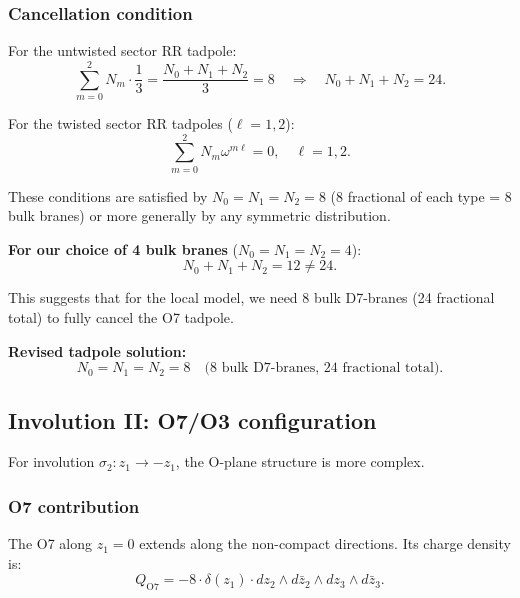 \documentclass[11pt]{article}
\begin{document}
\subsubsection{Cancellation condition}

For the untwisted sector RR tadpole:
\begin{equation}
\sum_{m=0}^{2} N_m \cdot \frac{1}{3} = \frac{N_0 + N_1 + N_2}{3} = 8 \quad \Rightarrow \quad N_0 + N_1 + N_2 = 24.
\end{equation}

For the twisted sector RR tadpoles ($\ell = 1, 2$):
\begin{equation}
\sum_{m=0}^{2} N_m \omega^{m\ell} = 0, \quad \ell = 1, 2.
\end{equation}

These conditions are satisfied by $N_0 = N_1 = N_2 = 8$ (8 fractional of each type = 8 bulk branes) or more generally by any symmetric distribution.

\textbf{For our choice of 4 bulk branes} ($N_0 = N_1 = N_2 = 4$):
\begin{equation}
N_0 + N_1 + N_2 = 12 \neq 24.
\end{equation}

This suggests that for the local model, we need 8 bulk D7-branes (24 fractional total) to fully cancel the O7 tadpole.

\textbf{Revised tadpole solution:}
\begin{equation}\boxed{
N_0 = N_1 = N_2 = 8 \quad \text{(8 bulk D7-branes, 24 fractional total)}.
}
\end{equation}

\subsection{Involution II: O7/O3 configuration}

For involution $\sigma_2: z_1 \to -z_1$, the O-plane structure is more complex.

\subsubsection{O7 contribution}

The O7 along $z_1 = 0$ extends along the non-compact directions. Its charge density is:
\begin{equation}
Q_{\text{O7}} = -8 \cdot \delta(z_1) \cdot dz_2 \wedge d\bar{z}_2 \wedge dz_3 \wedge d\bar{z}_3.
\end{equation}
\end{document}
